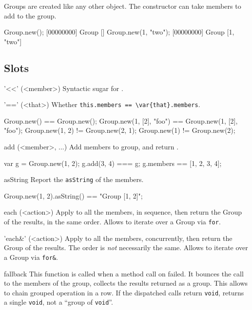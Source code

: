 Groups are created like any other object. The constructor can take members
to add to the group.

\begin{urbiscript}
Group.new();
[00000000] Group []
Group.new(1, "two");
[00000000] Group [1, "two"]
\end{urbiscript}

\subsection{Slots}

\begin{urbiscriptapi}
\item['<<'](<member>)%
  Syntactic sugar for .


\item['=='](<that>)%
  Whether \lstinline|this.members == \var{that}.members|.
\begin{urbiassert}
               Group.new() == Group.new();
Group.new(1, [2], "foo") == Group.new(1, [2], "foo");
         Group.new(1, 2) != Group.new(2, 1);
            Group.new(1) != Group.new(2);
\end{urbiassert}


\item[add](<member>, ...)%
  Add members to \this group, and return \this.
\begin{urbiassert}
var g = Group.new(1, 2);
g.add(3, 4) === g;
g.members == [1, 2, 3, 4];
\end{urbiassert}


\item[asString]
  Report the \lstinline|asString| of the members.
\begin{urbiassert}
Group.new(1, 2).asString() == "Group [1, 2]";
\end{urbiassert}


\item[each](<action>)%
  Apply  to all the members, in sequence, then return the
  Group of the results, in the same order.  Allows to iterate over a
  Group via \lstinline|for|.


\item['each&'](<action>)%
  Apply  to all the members, concurrently, then return the
  Group of the results.  The order is \emph{not} necessarily the same.
  Allows to iterate over a Group via \lstinline|for&|.


\item[fallback]
  This function is called when a method call on \this
  failed.  It bounces the call to the members of the group, collects
  the results returned as a group.  This allows to chain grouped
  operation in a row.  If the dispatched calls return
  \lstinline|void|, returns a single \lstinline|void|, not a ``group
  of \lstinline|void|''.



\end{urbiscriptapi}
